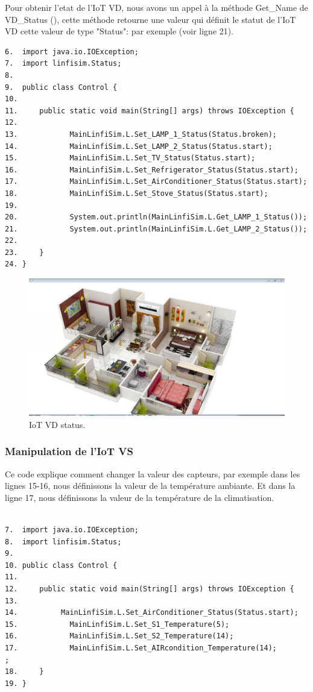 Pour obtenir l'etat de l'IoT VD, nous avons un appel à la méthode Get\_Name de VD\_Status (), cette méthode retourne une valeur qui définit le statut de l'IoT VD cette valeur de type "Status": par exemple (voir ligne 21).
\begin{lstlisting}
6.	import java.io.IOException;
7.	import linfisim.Status;
8.	
9.	public class Control {
10.	
11.	    public static void main(String[] args) throws IOException {
12.	
13.	           MainLinfiSim.L.Set_LAMP_1_Status(Status.broken);
14.	           MainLinfiSim.L.Set_LAMP_2_Status(Status.start);
15.	           MainLinfiSim.L.Set_TV_Status(Status.start);
16.	           MainLinfiSim.L.Set_Refrigerator_Status(Status.start);
17.	           MainLinfiSim.L.Set_AirConditioner_Status(Status.start);
18.	           MainLinfiSim.L.Set_Stove_Status(Status.start);
19.	
20.	           System.out.println(MainLinfiSim.L.Get_LAMP_1_Status());
21.	           System.out.println(MainLinfiSim.L.Get_LAMP_2_Status());
22.	           
23.	    }
24.	}

\end{lstlisting}

\begin{figure}[H]
    \centering
    \includegraphics[scale=0.5]{chap1/fc21.png}
    \caption{IoT VD status.}
    \label{fc21}
\end{figure}

\subsubsection{Manipulation de l'IoT VS}
Ce code explique comment changer la valeur des capteurs, par exemple dans les lignes 15-16, nous définissons la valeur de la température ambiante. Et dans  la ligne 17, nous définissons la valeur de la température de la climatisation.
\begin{lstlisting}

7.	import java.io.IOException;
8.	import linfisim.Status;
9.	
10.	public class Control {
11.	
12.	    public static void main(String[] args) throws IOException {
13.	
14.	         MainLinfiSim.L.Set_AirConditioner_Status(Status.start);
15.	           MainLinfiSim.L.Set_S1_Temperature(5);
16.	           MainLinfiSim.L.Set_S2_Temperature(14);
17.	           MainLinfiSim.L.Set_AIRcondition_Temperature(14);          ;           
18.	    }
19.	}

\end{lstlisting}
